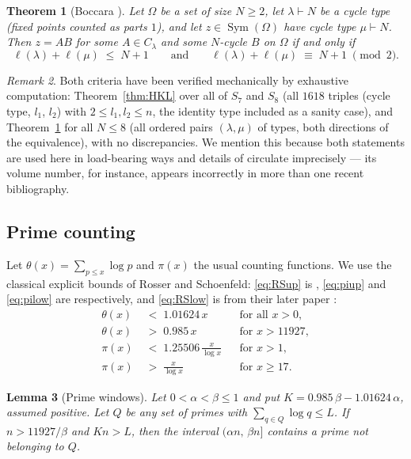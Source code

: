 \documentclass[11pt]{amsart}
\numberwithin{equation}{section}
\newtheorem{theorem}{Theorem}[section]
\newtheorem{lemma}[theorem]{Lemma}
\theoremstyle{remark}
\newtheorem{remark}[theorem]{Remark}
\newcommand{\Sym}{\operatorname{Sym}}
\begin{document}
\begin{theorem}[Boccara {\cite{Boccara82}}]\label{thm:Boccara}
Let $\Omega$ be a set of size $N\ge 2$, let $\lambda\vdash N$ be a cycle type
(fixed points counted as parts $1$), and let $z\in\Sym(\Omega)$ have cycle type
$\mu\vdash N$. Then $z=AB$ for some $A\in C_\lambda$ and some $N$-cycle $B$ on
$\Omega$ if and only if
\[
\ell(\lambda)+\ell(\mu)\;\le\;N+1
\qquad\text{and}\qquad
\ell(\lambda)+\ell(\mu)\;\equiv\;N+1\;\pmod 2 .
\]
\end{theorem}

\begin{remark}\label{rem:machine}
Both criteria have been verified mechanically by exhaustive computation:
Theorem~\ref{thm:HKL} over all of $S_7$ and $S_8$ (all $1618$ triples (cycle
type, $l_1$, $l_2$) with $2\le l_1,l_2\le n$, the identity type included as a
sanity case), and Theorem~\ref{thm:Boccara} for all $N\le 8$ (all ordered pairs
$(\lambda,\mu)$ of types, both directions of the equivalence), with no
discrepancies. We mention this because both statements are used here in
load-bearing ways and details of \cite{Boccara82} circulate imprecisely --- its
volume number, for instance, appears incorrectly in more than one recent
bibliography.
\end{remark}

\subsection{Prime counting}
Let $\theta(x)=\sum_{p\le x}\log p$ and $\pi(x)$ the usual counting functions. We
use the classical explicit bounds of Rosser and Schoenfeld: \eqref{eq:RSup} is
\cite[Theorem~9, eq.~(3.32)]{RS}, \eqref{eq:piup} and \eqref{eq:pilow} are
\cite[eqs.~(3.6) and (3.5)]{RS} respectively, and \eqref{eq:RSlow} is from their
later paper
\cite[Corollary to Theorem~6]{RS75}:
\begin{align}
\theta(x)&\;<\;1.01624\,x  &&\text{for all } x>0, \label{eq:RSup}\\
\theta(x)&\;>\;0.985\,x    &&\text{for } x> 11927, \label{eq:RSlow}\\
\pi(x)&\;<\;1.25506\,\frac{x}{\log x} &&\text{for } x>1, \label{eq:piup}\\
\pi(x)&\;>\;\frac{x}{\log x} &&\text{for } x\ge 17. \label{eq:pilow}
\end{align}

\begin{lemma}[Prime windows]\label{lem:window}
Let $0<\alpha<\beta\le 1$ and put $K=0.985\,\beta-1.01624\,\alpha$, assumed
positive. Let $Q$ be any set of primes with $\sum_{q\in Q}\log q\le L$. If
$n> 11927/\beta$ and $Kn>L$, then the interval $(\alpha n,\,\beta n]$ contains a
prime not belonging to $Q$.
\end{lemma}
\end{document}
